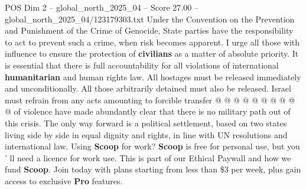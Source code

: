 \begin{textsample}{POS Dim 2 – global\_north\_2025\_04 – Score 27.00 – global\_north\_2025\_04/123179303.txt}
Under the Convention on the Prevention and Punishment of the Crime of Genocide, State parties have the responsibility to act to prevent such a crime, when risk becomes apparent.
I urge all those with influence to ensure the protection of \textbf{civilians} as a matter of absolute priority.
It is essential that there is full accountability for all violations of international \textbf{humanitarian} and human rights law.
All hostages must be released immediately and unconditionally.
All those arbitrarily detained must also be released.
Israel must refrain from any acts amounting to forcible transfer @ @ @ @ @ @ @ @ @ @ of violence have made abundantly clear that there is no military path out of this crisis.
The only way forward is a political settlement, based on two states living side by side in equal dignity and rights, in line with UN resolutions and international law.
Using \textbf{Scoop} for work? \textbf{Scoop} is free for personal use, but you ' ll need a licence for work use.
This is part of our Ethical Paywall and how we fund \textbf{Scoop}.
Join today with plans starting from less than \$3 per week, plus gain access to exclusive \textbf{Pro} features.

\end{textsample}
